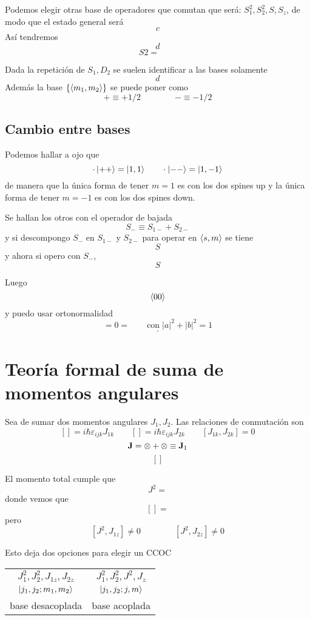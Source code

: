 \documentclass[10pt,oneside]{CBFT_book}
\begin{document}
Podemos elegir otras base de operadores que comutan que será: $S_ 1^2, S_2^2, S, S_{z}$, de modo que el estado 
general 
será
\[
	c
\]
Así tendremos
\[
	d
\]
\[
	S 2 =  \qquad 
\]

Dada la repetición de $S_1,D_2$ se suelen identificar a las bases solamente 
\[
	d
\]
Además la base $\{ \Braket{m_1,m_2}\}$ se puede poner como 
\[
	+ \equiv + 1/2 \qquad\qquad - \equiv - 1/2
\]

\subsection{Cambio entre bases}

Podemos hallar a ojo que 
\[
	\cdot \Ket{++} = \Ket{1,1} \qquad \cdot \Ket{--} = \Ket{1,-1} 
\]
de manera que la única forma de tener $m=1$ es con los dos spines up y la única forma de tener $m=-1$ es con 
los dos 
spines down.

Se hallan los otros con el operador de bajada
\[
	S_- \equiv S_{1-} + S_{2-}
\]
y si descompongo $S_-$ en $S_{1-}$ y $S_{2-}$ para operar en $\Braket{s,m}$ se tiene 
\[
	S
\]
y ahora si opero con $S_-$,
\[
	S
\]

Luego
\[
	\Braket{00}
\]
y puedo usar ortonormalidad 
\[
	= 0 = \qquad \text{con} \; |a|^2 + |b|^2 = 1
\]
\[
	\cdot 
\]


\section{Teoría formal de suma de momentos angulares}

Sea de sumar dos momentos angulares $J_1, J_2$. Las relaciones de conmutación son
\[
	[] = i\hbar \varepsilon_{ijk}J_{1k} \qquad [] = i\hbar \varepsilon_{ijk}J_{2k} \qquad
	[J_{1k},J_{2k}] = 0
\]
\[
	\vb{J} = \otimes + \otimes \equiv \vb{J}_1
\]
\[
	[]
\]

El momento total  cumple que 
\[
	J^2 = 
\]
donde vemos que 
\[
	[] =
\]
pero 
\[
	[ J^2 , J_{1z}] \neq 0  \qquad \qquad [ J^2 , J_{2z}] \neq 0
\]

Esto deja dos opciones para elegir un CCOC

\begin{center}
\begin{tabular}{|c|c|}
\hline 
$J_1^2, J_2^2, J_{1z}, J_{2z}$ & $J_1^2, J_2^2, J^2, J_{z}$ \\
$\Ket{j_1,j_2;m_1,m_2}$ & $\Ket{j_1,j_2;j,m}$ \\
base desacoplada & base acoplada \\
\hline
\end{tabular}
\end{center}
\end{document}
